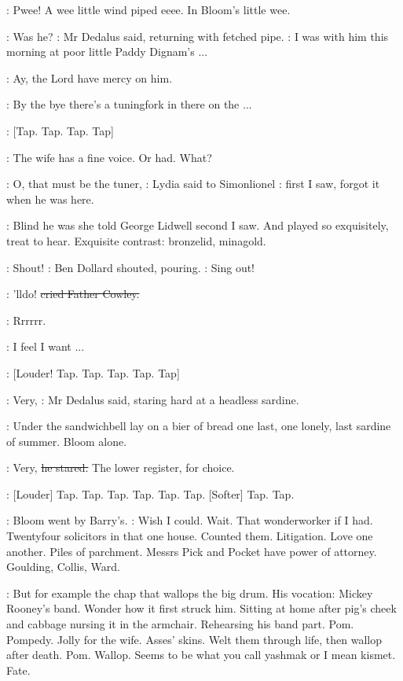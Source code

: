 :
Pwee! A wee little wind piped eeee. In Bloom's little wee.

\simon:
Was he?
:
Mr Dedalus said, returning with fetched pipe.
\simon:
I was with him this morning at poor little Paddy Dignam's ...

\cowley:
Ay, the Lord have mercy on him.

\simon:
By the bye there's a tuningfork in there on the ...

\stripling:
[Tap. Tap. Tap. Tap]

\lidwell:
The wife has a fine voice. Or had. What?

\MissD:
O, that must be the tuner,
:
Lydia said to Simonlionel
\MissD:
first I saw, forgot
it when he was here.

:
Blind he was she told George Lidwell second I saw. And played so
exquisitely, treat to hear. Exquisite contrast: bronzelid, minagold.

\dollard:
Shout!
:
Ben Dollard shouted, pouring.
\dollard:
Sing out!

\cowley:
'lldo!
\sout{cried Father Cowley.}

:
Rrrrrr.

\BloomInt:
I feel I want ...

\stripling:
[Louder! Tap. Tap. Tap. Tap. Tap]

\simon:
Very,
:
Mr Dedalus said, staring hard at a headless sardine.

:
Under the sandwichbell
lay on a bier of bread one last, one lonely, last
sardine of summer. Bloom alone.

\simon:
Very,
\sout{he stared.}
The lower register, for choice.

\stripling:
[Louder] Tap. Tap. Tap. Tap. Tap. Tap.
[Softer] Tap. Tap.

:
Bloom went by Barry's.
\BloomInt:
Wish I could. Wait. That wonderworker if I
had. Twentyfour solicitors in that one house. Counted them. Litigation.
Love one another. Piles of parchment. Messrs Pick and Pocket have power
of attorney. Goulding, Collis, Ward.

\BloomInt:
But for example the chap that wallops the big drum. His vocation:
Mickey Rooney's band. Wonder how it first struck him. Sitting at home
after pig's cheek and cabbage nursing it in the armchair.
Rehearsing his
band part. Pom. Pompedy. Jolly for the wife. Asses' skins. Welt them
through life, then wallop after death. Pom. Wallop. Seems to be what you
call yashmak or I mean kismet. Fate.

